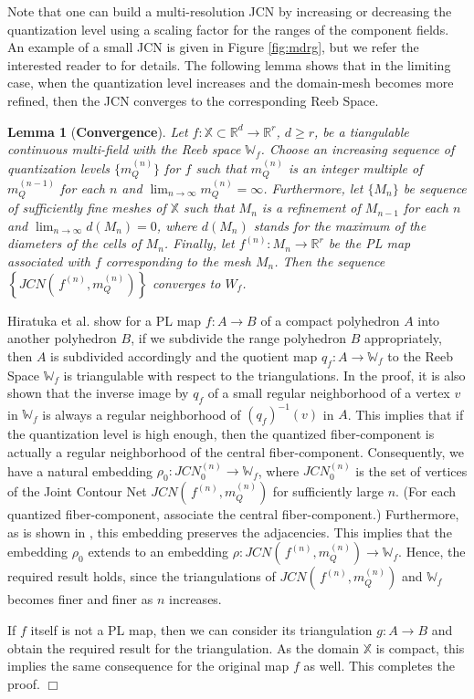 \documentclass[twocolumn]{article}
\newtheorem{lemma}[theorem]{Lemma}
\newcommand{\X}{\mathbb{X}}
\newcommand{\R}{\mathbb{R}}
\newcommand{\RS}{\mathbb{W}_f}
\newcommand{\JCN}[2]{JCN#1\,#2}
\newcommand{\figref}[1]{Figure \ref{fig:#1}}
\renewenvironment{proof}{{\bf Proof. }}{\hspace*{\fill}$\Box$\bigskip\noindent}
\begin{document}
Note that one can build a multi-resolution JCN by increasing or
 decreasing the quantization level using a scaling factor for the
 ranges of the component fields. An example of a small JCN is given in \figref{mdrg}, but
 we refer the interested reader to \cite{2013-Carr-TVCG} for details.
 The following lemma shows that in the limiting case, when the
 quantization level increases and the domain-mesh becomes more
 refined, then the JCN converges to the corresponding Reeb Space.

\begin{lemma}[\textbf{Convergence}]
\label{lem:convergence}
Let $f : \X \subset \R^d \to \R^r$, $d \geq r$, be a tiangulable continuous 
multi-field with the Reeb space $\RS$. 
Choose an increasing sequence of quantization levels $\{m_Q^{(n)}\}$ for $f$ 
such that $m_Q^{(n)}$ is an integer multiple of $m_Q^{(n-1)}$ for each $n$ 
and $\displaystyle\lim_{n \to \infty}m_Q^{(n)} = \infty$. 
Furthermore, let $\{M_n\}$ be sequence of sufficiently fine meshes 
of $\X$ such that $M_n$ is a refinement of $M_{n-1}$ for each $n$ and 
$\displaystyle\lim_{n\to \infty} d(M_n) = 0$, where $d(M_n)$ stands for 
the maximum of the diameters of the cells of $M_n$. 
Finally, let $f^{(n)} : M_n \to \R^r$ be the PL map associated with $f$ 
corresponding to the mesh $M_n$. 
Then the sequence $\left\{\JCN(f^{(n)}, m_Q^{(n)})\right\}$ 
converges to $W_f$.
\end{lemma}
\noindent
\begin{proof} 
Hiratuka et al. \cite{Hiratuka2013} show
for a PL map $f : A \to B$ of a compact polyhedron $A$ into
another polyhedron $B$, if we subdivide the range polyhedron $B$
appropriately, then $A$ is subdivided accordingly and the quotient map
$q_f : A \to \RS$ to the Reeb Space $\RS$ is triangulable with respect
to the triangulations. In the proof, it is also shown that the inverse
image by $q_f$ of a small regular neighborhood of a vertex $v$ in
$\RS$ is always a regular neighborhood of $(q_f)^{-1}(v)$ in $A$. This
implies that if the quantization level is high enough, then the
quantized fiber-component is actually a regular neighborhood of the
central fiber-component. Consequently, we have a natural embedding
$\rho_0: JCN_0^{(n)} \to \RS$, where $JCN_0^{(n)}$ is the set of
vertices of the Joint Contour Net $\JCN(f^{(n)},m_Q^{(n)})$ for
sufficiently large $n$. (For each quantized
fiber-component, associate the central fiber-component.) Furthermore,
as is shown in \cite{Hiratuka2013}, this embedding preserves the
adjacencies. This implies that the embedding $\rho_0$ extends to
an embedding $\rho : \JCN(f^{(n)},m_Q^{(n)}) \to \RS$. Hence, the required result holds,
since the triangulations of $\JCN(f^{(n)},m_Q^{(n)})$ and $\RS$
becomes finer and finer as $n$ increases.

If $f$ itself is not a PL map, then we can consider its triangulation
$g : A \to B$ and obtain the required result for the triangulation. As
the domain $\X$ is compact, this implies the same consequence for the
original map $f$ as well. This completes the proof.
\end{proof}
\end{document}

